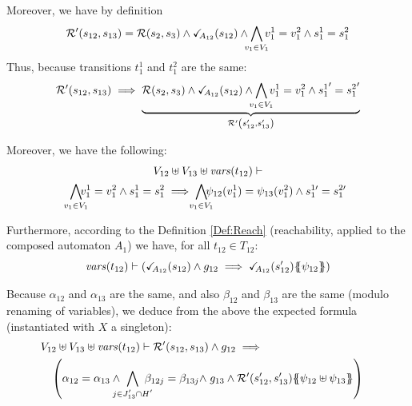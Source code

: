 \documentclass[runningheads]{llncs}
\begin{document}
\begin{enumerate}
Moreover, we have by definition 
\[\mathcal{R}' \mpar{s_{12}, s_{13}} =  \mathcal{R}\mpar{s_{2}, s_{3}} \land \reach{A_{12}}(s_{12}) \wedge \bigwedge_\subbox{v_1\in V_1} v^1_1=v^2_1\wedge s^1_1 = s^2_1 \]
Thus, because transitions $t^1_1$ and  $t^2_1$ are the same:
\[\mathcal{R}' \mpar{s_{12}, s_{13}} \implies
\underbrace{\mathcal{R}\mpar{s_{2}, s_{3}} \land \reach{A_{12}}(s_{12}) \wedge \bigwedge_\subbox{v_1\in V_1} v^1_1=v^2_1\wedge {s^1_1}^\prime = {s^2_1}^\prime}_{\mathcal{R}' \mpar{s'_{12}, s'_{13}}}
\]


Moreover, we have  the following:
\begin{multline*}
V_{12} \uplus V_{13}  \uplus \fvars{t_{12}} \vdash\\
\bigwedge_\subbox{v_1\in V_1}\!\! v^1_1=v^2_1  \wedge s^1_1 = s^2_1 \implies \bigwedge_\subbox{v_1\in V_1}\!\! \psi_{12}(v^1_1)=\psi_{13}(v^2_1)  \wedge s^{1\prime}_1 = s^{2\prime}_1 
\end{multline*}
  

 
 Furthermore, according to the Definition \ref{Def:Reach} (reachability, applied to the composed automaton \(A_1\)) we have, for all $t_{12} \in T_{12}$:
\[ \fvars{t_{12}} \vdash \left(\reach{A_{12}}\mpar{s_{12}} \wedge g_{12} \implies \reach{A_{12}}\mpar{s_{12}'}\psubst{\psi_{12}}\right) \]	

Because $\alpha_{12}$ and $\alpha_{13}$ are the same, and also  $\beta_{12}$ and $\beta_{13}$ are the same (modulo renaming of variables), we deduce from the above the expected formula (instantiated with $X$ a singleton): %
\begin{multline*}
V_{12} \uplus V_{13}  \uplus \fvars{t_{12}} \vdash
\mathcal{R}'\mpar{s_{12}, s_{13}} \wedge g_{12} 
\implies \hspace{10em}\\ %
 \mpar{\everymath{\displaystyle}
			\alpha_{12} = \alpha_{13} \wedge \bigwedge_\subbox{j \in J'_{13} \cap H'} \beta_{12j} = \beta_{13j} \nwedge g_{13} \wedge 
			 \mathcal{R}'\mpar{s'_{12}, s'_{13}}\psubst{\psi_{12} \uplus \psi_{13}}
}   
\end{multline*}	







\end{enumerate}
\end{document}

